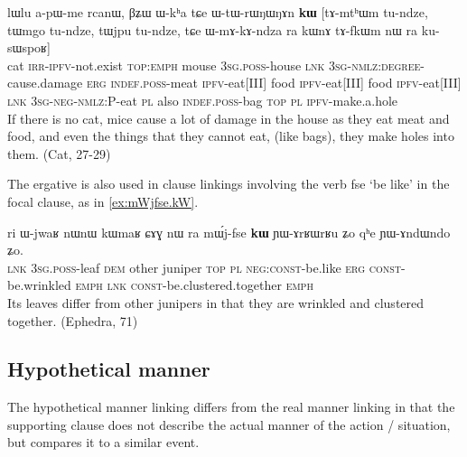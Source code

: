 \documentclass[oldfontcommands,oneside,a4paper,11pt]{article}
\newcommand{\ipa}[1]{{\phon \mbox{#1}}} %
\begin{document}
\begin{exe}
\ex \label{ex:WtWrWNWNAn}
\gll
\ipa{lɯlu}         	\ipa{a-pɯ-me}         	\ipa{rcanɯ,}         	\ipa{βʑɯ}         	\ipa{ɯ-kʰa}         	\ipa{tɕe}         	\ipa{ɯ-tɯ-rɯŋɯŋɤn}         	\ipa{\textbf{kɯ}}          [\ipa{tɤ-mtʰɯm}         	\ipa{tu-ndze,}         	\ipa{tɯmgo}         	\ipa{tu-ndze,}         	\ipa{tɯjpu}         	\ipa{tu-ndze,}         \ipa{tɕe}         	\ipa{ɯ-mɤ-kɤ-ndza}         	\ipa{ra}         	\ipa{kɯnɤ}         	\ipa{tɤ-fkɯm}         	\ipa{nɯ} \ipa{ra}         	\ipa{ku-sɯspoʁ}]         \\
cat \textsc{irr-ipfv}-not.exist \textsc{top:emph} mouse \textsc{3sg.poss}-house \textsc{lnk} \textsc{3sg-nmlz:degree}-cause.damage \textsc{erg} \textsc{indef.poss}-meat \textsc{ipfv}-eat[III] food \textsc{ipfv}-eat[III] food \textsc{ipfv}-eat[III]  \textsc{lnk} \textsc{3sg-neg-nmlz:P}-eat \textsc{pl} also \textsc{indef.poss}-bag \textsc{top} \textsc{pl} \textsc{ipfv}-make.a.hole \\
\glt  If there is no cat, mice cause a lot of damage in the house as they eat meat and food, and even the things that they cannot eat, (like bags), they make holes into them. (Cat, 27-29)
\end{exe}
 
 
 The ergative is also used in clause linkings involving the verb \ipa{fse} `be like' in the focal clause, as in \ref{ex:mWjfse.kW}.
 
 \begin{exe}
\ex \label{ex:mWjfse.kW}
\gll
\ipa{ri} 	\ipa{ɯ-jwaʁ} 	\ipa{nɯnɯ} 	\ipa{kɯmaʁ} 	\ipa{ɕɤɣ} 	\ipa{nɯ} \ipa{ra} 	\ipa{mɯ́j-fse} 	\ipa{\textbf{kɯ}} 	\ipa{ɲɯ-ɤrʁɯrʁu} 	\ipa{ʑo} 	\ipa{qʰe} 	\ipa{ɲɯ-ɤndɯndo} 	\ipa{ʑo.} \\
\textsc{lnk} \textsc{3sg.poss}-leaf \textsc{dem} other juniper \textsc{top} \textsc{pl} \textsc{neg:const}-be.like \textsc{erg} \textsc{const}-be.wrinkled \textsc{emph} \textsc{lnk}  \textsc{const}-be.clustered.together \textsc{emph} \\
\glt Its leaves differ from other junipers in that they are wrinkled and clustered together. (Ephedra, 71)
 \end{exe}
 
\subsection{Hypothetical manner}
The hypothetical manner linking differs from the real manner linking in that the supporting clause does not describe the actual manner of the action / situation, but compares it to a similar event. 
\end{document}
